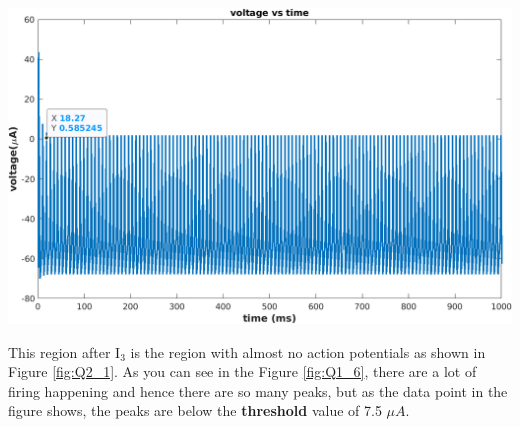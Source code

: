 \documentclass[12pt, a4paper]{article}
\begin{document}
\begin{center}
\begin{minipage}{0.70\linewidth}
    \includegraphics[width=\textwidth]{Q1_6}
    \label{fig:Q1_6}
\end{minipage}
\end{center}

\vspace{1em}

This region after I$_{3}$ is the region with almost no action potentials as shown in Figure \ref{fig:Q2_1}. As you can see in the Figure \ref{fig:Q1_6}, there are a lot of firing happening and hence there are so many peaks, but as the data point in the figure shows, the peaks are below the \textbf{threshold} value of 7.5 $\mu A$.
\end{document}
